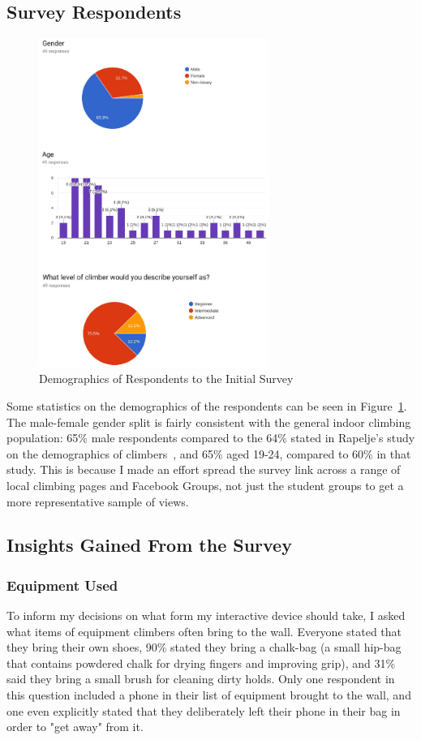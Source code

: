 \subsection{Survey Respondents}
\begin{figure}
\includegraphics[width=7.5cm]{imgs/surveydemographics}
\caption{Demographics of Respondents to the Initial Survey}
\label{fig:surveydemographics}
\end{figure}
Some statistics on the demographics of the respondents can be seen in Figure~\ref{fig:surveydemographics}.
The male-female gender split is fairly consistent with the general indoor climbing population: 65\% male respondents compared to the 64\% stated in Rapelje's study on the demographics of climbers~\cite{climbing-sub-worlds}, and 65\% aged 19-24, compared to 60\% in that study.
This is because I made an effort spread the survey link across a range of local climbing pages and Facebook Groups, not just the student groups to get a more representative sample of views.

\subsection{Insights Gained From the Survey}
\subsubsection{Equipment Used}
To inform my decisions on what form my interactive device should take, I asked what items of equipment climbers often bring to the wall.
Everyone stated that they bring their own shoes, 90\% stated they bring a chalk-bag (a small hip-bag that contains powdered chalk for drying fingers and improving grip), and 31\% said they bring a small brush for cleaning dirty holds.
Only one respondent in this question included a phone in their list of equipment brought to the wall, and one even explicitly stated that they deliberately left their phone in their bag in order to "get away" from it. 

